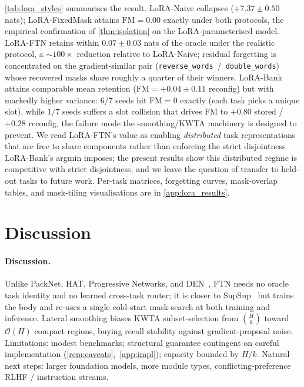 \documentclass{article}
\theoremstyle{plain}
\theoremstyle{remark}
\begin{document}


\cref{tab:lora_styles} summarises the result. LoRA-Naive collapses ($+7.37\pm 0.50$ nats); LoRA-FixedMask attains $\mathrm{FM}=0.00$ exactly under both protocols, the empirical confirmation of \cref{thm:isolation} on the LoRA-parameterised model. LoRA-FTN retains within $0.07\pm 0.03$ nats of the oracle under the realistic protocol, a $\sim\!100\times$ reduction relative to LoRA-Naive; residual forgetting is concentrated on the gradient-similar pair (\texttt{reverse\_words}~/~\texttt{double\_words}) whose recovered masks share roughly a quarter of their winners. LoRA-Bank attains comparable mean retention ($\mathrm{FM}=+0.04\pm 0.11$ reconfig) but with markedly higher variance: $6/7$ seeds hit $\mathrm{FM}=0$ exactly (each task picks a unique slot), while $1/7$ seeds suffers a slot collision that drives $\mathrm{FM}$ to $+0.80$ stored / $+0.28$ reconfig, the failure mode the smoothing/KWTA machinery is designed to prevent. We read LoRA-FTN's value as enabling \emph{distributed} task representations that are free to share components rather than enforcing the strict disjointness LoRA-Bank's argmin imposes; the present results show this distributed regime is competitive with strict disjointness, and we leave the question of transfer to held-out tasks to future work. Per-task matrices, forgetting curves, mask-overlap tables, and mask-tiling visualisations are in \cref{app:lora_results}.

\section{Discussion}

\paragraph{Discussion.}
Unlike PackNet, HAT, Progressive Networks, and DEN~\citep{mallya2018packnet,serra2018overcoming,rusu2016progressive,yoon2018lifelong}, FTN needs no oracle task identity and no learned cross-task router; it is closer to SupSup~\citep{wortsman2020supermasks} but trains the body and re-uses a single cold-start mask-search at both training and inference. Lateral smoothing biases KWTA subset-selection from $\binom{H}{k}$ toward $\mathcal{O}(H)$ compact regions, buying recall stability against gradient-proposal noise. Limitations: modest benchmarks; structural guarantee contingent on careful implementation (\cref{rem:caveats},~\cref{app:impl}); capacity bounded by $H/k$. Natural next steps: larger foundation models, more module types, conflicting-preference RLHF / instruction streams.
\end{document}
